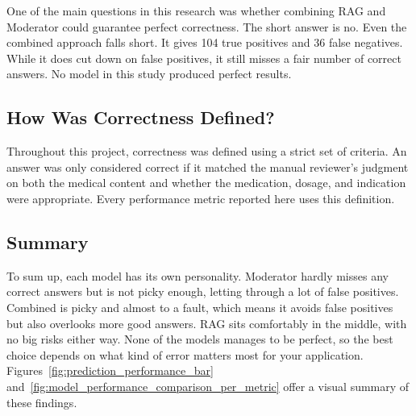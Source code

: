 One of the main questions in this research was whether combining RAG and Moderator could guarantee perfect correctness. The short answer is no. Even the combined approach falls short. It gives 104 true positives and 36 false negatives. While it does cut down on false positives, it still misses a fair number of correct answers. No model in this study produced perfect results.

\subsection{How Was Correctness Defined?}

Throughout this project, correctness was defined using a strict set of criteria. An answer was only considered correct if it matched the manual reviewer's judgment on both the medical content and whether the medication, dosage, and indication were appropriate. Every performance metric reported here uses this definition.

\subsection{Summary}

To sum up, each model has its own personality. Moderator hardly misses any correct answers but is not picky enough, letting through a lot of false positives. Combined is picky and almost to a fault, which means it avoids false positives but also overlooks more good answers. RAG sits comfortably in the middle, with no big risks either way. None of the models manages to be perfect, so the best choice depends on what kind of error matters most for your application. Figures~\ref{fig:prediction_performance_bar} and~\ref{fig:model_performance_comparison_per_metric} offer a visual summary of these findings.

